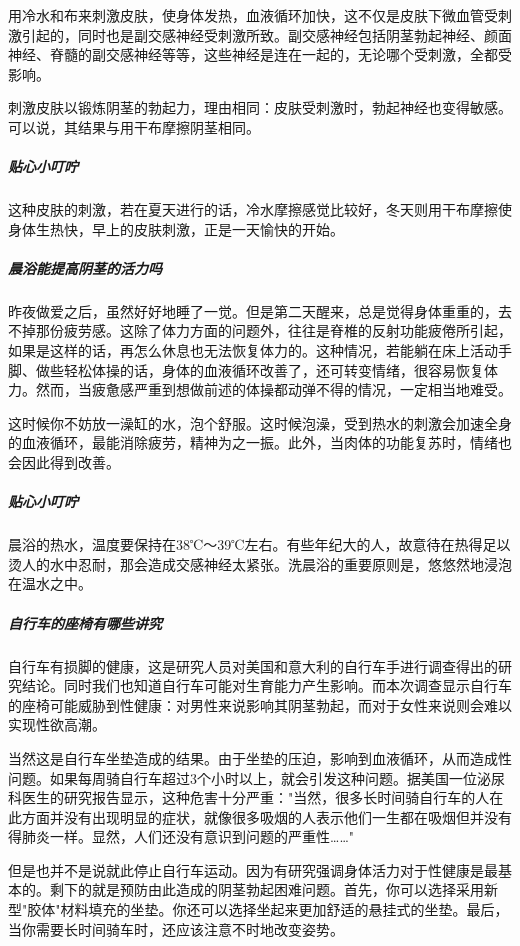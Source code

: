 用冷水和布来刺激皮肤，使身体发热，血液循环加快，这不仅是皮肤下微血管受刺激引起的，同时也是副交感神经受刺激所致。副交感神经包括阴茎勃起神经、颜面神经、脊髓的副交感神经等等，这些神经是连在一起的，无论哪个受刺激，全都受影响。

刺激皮肤以锻炼阴茎的勃起力，理由相同：皮肤受刺激时，勃起神经也变得敏感。可以说，其结果与用干布摩擦阴茎相同。

\subparagraph{贴心小叮咛}

这种皮肤的刺激，若在夏天进行的话，冷水摩擦感觉比较好，冬天则用干布摩擦使身体生热快，早上的皮肤刺激，正是一天愉快的开始。

\subparagraph{晨浴能提高阴茎的活力吗}

昨夜做爱之后，虽然好好地睡了一觉。但是第二天醒来，总是觉得身体重重的，去不掉那份疲劳感。这除了体力方面的问题外，往往是脊椎的反射功能疲倦所引起，如果是这样的话，再怎么休息也无法恢复体力的。这种情况，若能躺在床上活动手脚、做些轻松体操的话，身体的血液循环改善了，还可转变情绪，很容易恢复体力。然而，当疲惫感严重到想做前述的体操都动弹不得的情况，一定相当地难受。

这时候你不妨放一澡缸的水，泡个舒服。这时候泡澡，受到热水的刺激会加速全身的血液循环，最能消除疲劳，精神为之一振。此外，当肉体的功能复苏时，情绪也会因此得到改善。

\subparagraph{贴心小叮咛}

晨浴的热水，温度要保持在38℃～39℃左右。有些年纪大的人，故意待在热得足以烫人的水中忍耐，那会造成交感神经太紧张。洗晨浴的重要原则是，悠悠然地浸泡在温水之中。

\subparagraph{自行车的座椅有哪些讲究}

自行车有损脚的健康，这是研究人员对美国和意大利的自行车手进行调查得出的研究结论。同时我们也知道自行车可能对生育能力产生影响。而本次调查显示自行车的座椅可能威胁到性健康：对男性来说影响其阴茎勃起，而对于女性来说则会难以实现性欲高潮。

当然这是自行车坐垫造成的结果。由于坐垫的压迫，影响到血液循环，从而造成性问题。如果每周骑自行车超过3个小时以上，就会引发这种问题。据美国一位泌尿科医生的研究报告显示，这种危害十分严重："当然，很多长时间骑自行车的人在此方面并没有出现明显的症状，就像很多吸烟的人表示他们一生都在吸烟但并没有得肺炎一样。显然，人们还没有意识到问题的严重性……"

但是也并不是说就此停止自行车运动。因为有研究强调身体活力对于性健康是最基本的。剩下的就是预防由此造成的阴茎勃起困难问题。首先，你可以选择采用新型"胶体"材料填充的坐垫。你还可以选择坐起来更加舒适的悬挂式的坐垫。最后，当你需要长时间骑车时，还应该注意不时地改变姿势。

